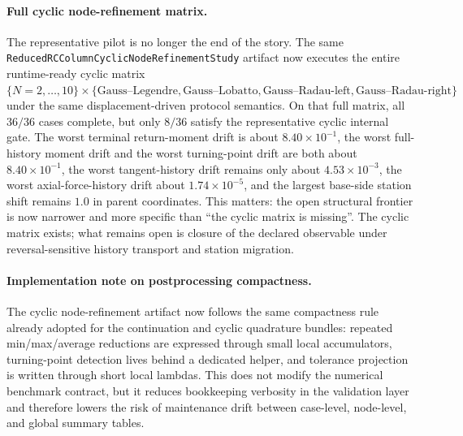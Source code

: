 \paragraph{Full cyclic node-refinement matrix.}
The representative pilot is no longer the end of the story. The same
\texttt{ReducedRCColumnCyclicNodeRefinementStudy} artifact now executes the
entire runtime-ready cyclic matrix
\(\{N=2,\dots,10\}\times\{\text{Gauss--Legendre},\text{Gauss--Lobatto},\text{Gauss--Radau-left},\text{Gauss--Radau-right}\}\)
under the same displacement-driven protocol semantics. On that full matrix,
all \(36/36\) cases complete, but only \(8/36\) satisfy the representative
cyclic internal gate. The worst terminal return-moment drift is about
\(8.40\times 10^{-1}\), the worst full-history moment drift and the worst
turning-point drift are both about \(8.40\times 10^{-1}\), the worst
tangent-history drift remains only about \(4.53\times 10^{-3}\), the worst
axial-force-history drift about \(1.74\times 10^{-5}\), and the largest
base-side station shift remains \(1.0\) in parent coordinates. This matters:
the open structural frontier is now narrower and more specific than ``the
cyclic matrix is missing''. The cyclic matrix exists; what remains open is
closure of the declared observable under reversal-sensitive history transport
and station migration.

\paragraph{Implementation note on postprocessing compactness.}
The cyclic node-refinement artifact now follows the same compactness rule
already adopted for the continuation and cyclic quadrature bundles: repeated
min/max/average reductions are expressed through small local accumulators,
turning-point detection lives behind a dedicated helper, and tolerance
projection is written through short local lambdas. This does not modify the
numerical benchmark contract, but it reduces bookkeeping verbosity in the
validation layer and therefore lowers the risk of maintenance drift between
case-level, node-level, and global summary tables.


